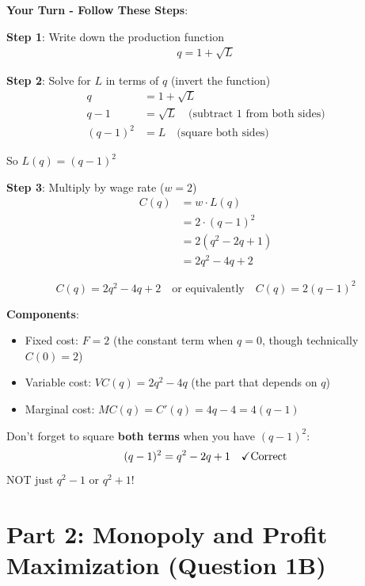 \documentclass[12pt]{article}
\begin{document}
\textbf{Your Turn - Follow These Steps}:

\textbf{Step 1}: Write down the production function
\begin{align*}
q = 1 + \sqrt{L}
\end{align*}

\textbf{Step 2}: Solve for $L$ in terms of $q$ (invert the function)
\begin{align*}
q &= 1 + \sqrt{L} \\
q - 1 &= \sqrt{L} \quad \text{(subtract 1 from both sides)} \\
(q-1)^2 &= L \quad \text{(square both sides)}
\end{align*}

So $L(q) = (q-1)^2$

\textbf{Step 3}: Multiply by wage rate ($w = 2$)
\begin{align*}
C(q) &= w \cdot L(q) \\
&= 2 \cdot (q-1)^2 \\
&= 2(q^2 - 2q + 1) \\
&= 2q^2 - 4q + 2
\end{align*}

\begin{keyidea}[Answer to 1A]
$$\boxed{C(q) = 2q^2 - 4q + 2 \quad \text{or equivalently} \quad C(q) = 2(q-1)^2}$$

\textbf{Components}:
\begin{itemize}
\item Fixed cost: $F = 2$ (the constant term when $q = 0$, though technically $C(0) = 2$)
\item Variable cost: $VC(q) = 2q^2 - 4q$ (the part that depends on $q$)
\item Marginal cost: $MC(q) = C'(q) = 4q - 4 = 4(q-1)$
\end{itemize}
\end{keyidea}

\begin{warning}
Don't forget to square \textbf{both terms} when you have $(q-1)^2$:
\begin{align*}
(q-1)^2 = q^2 - 2q + 1 \quad \text{\checkmark Correct}
\end{align*}
NOT just $q^2 - 1$ or $q^2 + 1$!
\end{warning}

\newpage

\section{Part 2: Monopoly and Profit Maximization (Question 1B)}
\end{document}
